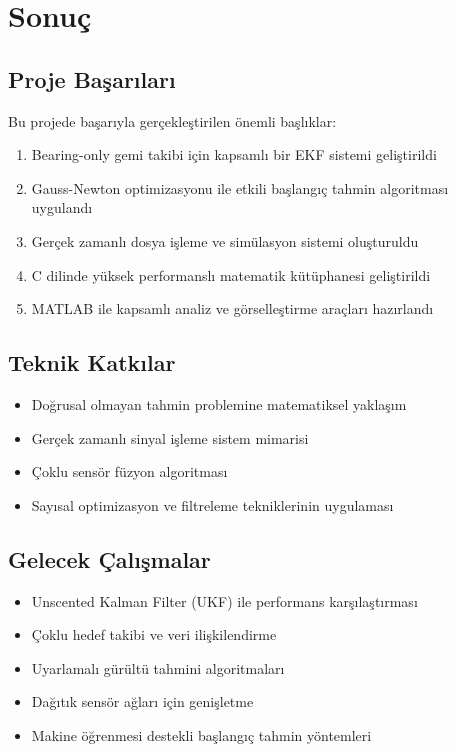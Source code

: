 \documentclass[12pt,a4paper]{article}
\begin{document}
\section{Sonuç}

\subsection{Proje Başarıları}
Bu projede başarıyla gerçekleştirilen önemli başlıklar:
\begin{enumerate}
    \item Bearing-only gemi takibi için kapsamlı bir EKF sistemi geliştirildi
    \item Gauss-Newton optimizasyonu ile etkili başlangıç tahmin algoritması uygulandı
    \item Gerçek zamanlı dosya işleme ve simülasyon sistemi oluşturuldu
    \item C dilinde yüksek performanslı matematik kütüphanesi geliştirildi
    \item MATLAB ile kapsamlı analiz ve görselleştirme araçları hazırlandı
\end{enumerate}

\subsection{Teknik Katkılar}
\begin{itemize}
    \item Doğrusal olmayan tahmin problemine matematiksel yaklaşım
    \item Gerçek zamanlı sinyal işleme sistem mimarisi
    \item Çoklu sensör füzyon algoritması
    \item Sayısal optimizasyon ve filtreleme tekniklerinin uygulaması
\end{itemize}

\subsection{Gelecek Çalışmalar}
\begin{itemize}
    \item Unscented Kalman Filter (UKF) ile performans karşılaştırması
    \item Çoklu hedef takibi ve veri ilişkilendirme
    \item Uyarlamalı gürültü tahmini algoritmaları
    \item Dağıtık sensör ağları için genişletme
    \item Makine öğrenmesi destekli başlangıç tahmin yöntemleri
\end{itemize}
\end{document}
